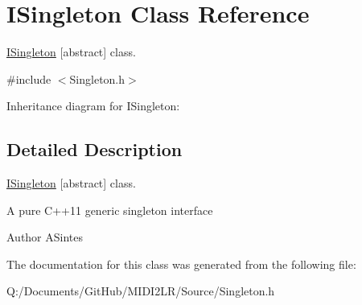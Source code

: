\hypertarget{class_i_singleton}{}\section{I\+Singleton Class Reference}
\label{class_i_singleton}


\hyperlink{class_i_singleton}{I\+Singleton} \mbox{[}abstract\mbox{]} class.  




{\ttfamily \#include $<$Singleton.\+h$>$}



Inheritance diagram for I\+Singleton\+:


\subsection{Detailed Description}
\hyperlink{class_i_singleton}{I\+Singleton} \mbox{[}abstract\mbox{]} class. 

A pure C++11 generic singleton interface \begin{DoxyAuthor}{Author}
A\+Sintes 
\end{DoxyAuthor}


The documentation for this class was generated from the following file\+:\begin{DoxyCompactItemize}
\item 
Q\+:/\+Documents/\+Git\+Hub/\+M\+I\+D\+I2\+L\+R/\+Source/Singleton.\+h\end{DoxyCompactItemize}
